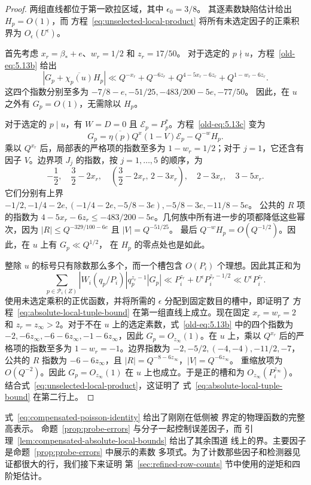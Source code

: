 \documentclass[11pt,a4paper]{article}
\numberwithin{equation}{section}
\numberwithin{figure}{section}
\theoremstyle{definition}
\theoremstyle{remark}
\begin{document}
\begin{proof}
两组直线都位于第一欧拉区域，其中 $\epsilon_0=3/8$。
其逐素数缺陷估计给出 $H_p=O(1)$，而
方程~\eqref{eq:unselected-local-product} 将所有未选定因子的正乘积界为
$O_\epsilon(U^\epsilon)$。

首先考虑 $x_r=\beta_*+e$、$w_r=1/2$ 和 $z_r=17/50$。
对于选定的 $p\nmid u$，方程~\eqref{old-eq:5.13b} 给出
\[
 |G_p+\overline{\chi_p(u)}H_p|
 \ll Q^{-x_r}+Q^{-6z_r}
       +Q^{4-5x_r-6z_r}+Q^{1-w_r-6z_r}.
\]
这四个指数分别至多为
$-7/8-e,-51/25,-483/200-5e,-77/50$。
因此，在 $u$ 之外有 $G_p=O(1)$，无需除以 $H_p$。

对于选定的 $p\mid u$，有 $W=D=0$ 且
$\mathcal E_p=P_p^*$。方程~\eqref{old-eq:5.13c} 变为
\[
 G_p=\overline{\eta(p)}Q^x(1-V)\mathcal E_p-Q^{-w}H_p.
\]
乘以 $Q^{x_r}$ 后，局部表的严格项的指数至多为 $1-w_r=1/2$；对于 $j=1$，它还含有因子
$V$。边界项 $J_j$ 的指数，按 $j=1,\ldots,5$ 的顺序，为
\[
 -\frac12,\quad \frac32-2x_r,\quad
 \left(\frac32-2x_r,\,2-3x_r\right),\quad
 2-3x_r,\quad 3-5x_r.
\]
它们分别有上界
$-1/2,-1/4-2e,(-1/4-2e,-5/8-3e),-5/8-3e,-11/8-5e$。
公共的 $R$ 项的指数为
$4-5x_r-6z_r\le-483/200-5e$。几何族中所有进一步的项都降低这些幂次，因为
$|R|\le Q^{-329/100-6e}$ 且 $|V|=Q^{-51/25}$。
最后 $Q^{-w}H_p=O(Q^{-1/2})$。因此，在 $u$ 上有 $G_p\ll Q^{1/2}$，
在 $H_p$ 的零点处也是如此。

整除 $u$ 的标号只有除数那么多个，而一个槽包含 $O(P_i)$
个理想。因此其正和为
\begin{equation}\label{eq:small-line-positive-slot}
 \sum_{p\in\mathcal P_i(Z)}
       |W_i(q_p/P_i)|q_p^{z_r-1}|G_p|
 \ll P_i^{z_r}+U^\epsilon P_i^{z_r-1/2}
 \ll U^\epsilon P_i^{z_r}.
\end{equation}
使用未选定乘积的正优函数，并将所需的 $\epsilon$ 分配到固定数目的槽中，即证明了
方程~\eqref{eq:absolute-local-tuple-bound} 在第一组直线上成立。现在固定 $x_r=w_r=2$ 和 $z_r=z_\infty>2$。对于不在
$u$ 上的选定素数，式~\eqref{old-eq:5.13b} 中的四个指数为
$-2,-6z_\infty,-6-6z_\infty,-1-6z_\infty$，因此
$G_p=O_{z_\infty}(1)$。在 $u$ 上，乘以
$Q^{x_r}$ 后的严格项的指数至多为 $1-w_r=-1$。边界指数为
$-2,-5/2,(-4,-4),-11/2,-7$，公共的 $R$ 指数为
$-6-6z_\infty$，且 $|R|=Q^{-8-6z_\infty}$，$|V|=Q^{-6z_\infty}$。
重缩放项为 $O(Q^{-2})$。因此 $G_p=O_{z_\infty}(1)$ 在 $u$
上也成立。于是正的槽和为 $O_{z_\infty}(P_i^{z_\infty})$。
结合式~\eqref{eq:unselected-local-product}，这证明了
式~\eqref{eq:absolute-local-tuple-bound} 在第二行上。
\end{proof}


式~\eqref{eq:compensated-poisson-identity} 给出了刚刚在低侧被
界定的物理函数的完整高表示。
命题~\ref{prop:probe-errors} 与分子一起控制误差因子，而
引理~\ref{lem:compensated-absolute-local-bounds} 给出了其余围道
线上的界。主要因子是命题~\ref{prop:probe-errors} 中展示的素数
多项式。为了计数那些因子和检测器见证都很大的行，我们接下来证明
第~\ref{sec:refined-row-counts} 节中使用的逆矩和四阶矩估计。
\end{document}

